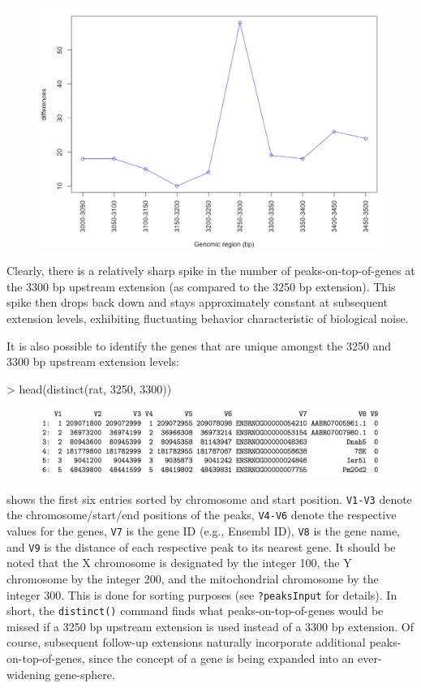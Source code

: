 \documentclass[12pt]{article}
\begin{document}
\begin{figure}[H]
\centering
\includegraphics{figures/fig3.png}
\end{figure}

Clearly, there is a relatively sharp spike in the number of peaks-on-top-of-genes at the 3300 bp upstream extension (as compared to the 3250 bp extension).  This spike then drops back down and stays approximately constant at subsequent extension levels, exhibiting fluctuating behavior characteristic of biological noise.  

It is also possible to identify the genes that are unique amongst the 3250 and 3300 bp upstream extension levels:

\begin{Schunk}
\begin{Sinput}
> head(distinct(rat, 3250, 3300))
\end{Sinput}
\end{Schunk}

\begin{figure}[H]
\centering
\includegraphics{figures/table1.png}
\end{figure}

shows the first six entries sorted by chromosome and start position.  \texttt{V1-V3} denote the chromosome/start/end positions of the peaks, \texttt{V4-V6} denote the respective values for the genes, \texttt{V7} is the gene ID (e.g., Ensembl ID), \texttt{V8} is the gene name, and \texttt{V9} is the distance of each respective peak to its nearest gene.  It should be noted that the X chromosome is designated by the integer 100, the Y chromosome by the integer 200, and the mitochondrial chromosome by the integer 300.  This is done for sorting purposes (see \texttt{?peaksInput} for details).  In short, the \texttt{distinct()} command finds what peaks-on-top-of-genes would be missed if a 3250 bp upstream extension is used instead of a 3300 bp extension.  Of course, subsequent follow-up extensions naturally incorporate additional peaks-on-top-of-genes, since the concept of a gene is being expanded into an ever-widening gene-sphere.  
\end{document}
